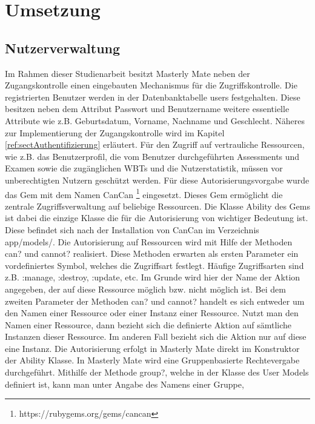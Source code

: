 \chapter{Umsetzung}\label{ref:chaptImplementation}

\section{Nutzerverwaltung}\label{ref:sectNutzerverwaltung}
\begin{k}
Im Rahmen dieser Studienarbeit besitzt Masterly Mate neben der Zugangskontrolle
einen eingebauten Mechanismus für die Zugriffskontrolle. Die registrierten
Benutzer werden in der Datenbanktabelle users festgehalten. Diese besitzen neben
dem Attribut Passwort und Benutzername weitere essentielle Attribute wie z.B.
Geburtsdatum, Vorname, Nachname und Geschlecht. Näheres zur Implementierung der
Zugangskontrolle wird im Kapitel \ref{ref:sectAuthentifizierung} erläutert.
Für den Zugriff auf vertrauliche Ressourcen, wie z.B. das Benutzerprofil, die
vom Benutzer durchgeführten Assessments und Examen sowie die zugänglichen WBTs
und die Nutzerstatistik, müssen vor unberechtigten Nutzern geschützt werden.
Für diese Autorisierungsvorgabe wurde das Gem mit dem Namen CanCan
\footnote{https://rubygems.org/gems/cancan} eingesetzt. Dieses Gem ermöglicht
die zentrale Zugriffsverwaltung auf beliebige Ressourcen. Die Klasse Ability des
Gems ist dabei die einzige Klasse die für die Autorisierung von wichtiger
Bedeutung ist. Diese befindet sich nach der Installation von CanCan im
Verzeichnis app/models/. Die Autorisierung auf Ressourcen wird mit Hilfe der
Methoden can? und cannot? realisiert. Diese Methoden erwarten als ersten
Parameter ein vordefiniertes Symbol, welches die Zugriffsart festlegt. Häufige
Zugriffsarten sind z.B. :manage, :destroy, :update, etc. Im Grunde wird hier der Name der
Aktion angegeben, der auf diese Ressource möglich bzw. nicht möglich ist. Bei
dem zweiten Parameter der Methoden can? und cannot? handelt es sich entweder um
den Namen einer Ressource oder einer Instanz einer Ressource. Nutzt man den
Namen einer Ressource, dann bezieht sich die definierte Aktion auf sämtliche
Instanzen dieser Ressource. Im anderen Fall bezieht sich die Aktion nur auf
diese eine Instanz. Die Autorisierung erfolgt in Masterly Mate direkt im
Konstruktor der Ability Klasse. In Masterly Mate wird eine Gruppenbasierte
Rechtevergabe durchgeführt. Mithilfe der Methode group?, welche in der Klasse
des User Models definiert ist, kann man unter Angabe des Namens einer Gruppe,

\end{k}
